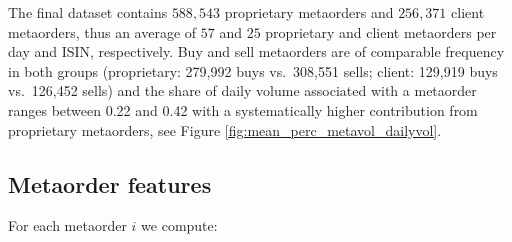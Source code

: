 \documentclass[11pt]{article}
\begin{document}
The final dataset contains $588,543$
proprietary metaorders and $256,371$ client metaorders, thus an average of $57$ and $25$ proprietary and client metaorders per day and ISIN, respectively. Buy and sell metaorders are of comparable frequency 
in both groups (proprietary: 279,992 buys vs.\ 308,551 sells; client: 129,919 buys vs.\ 126,452 sells) and the share of daily volume associated with a metaorder ranges between 0.22 and 0.42 with a systematically higher contribution from proprietary metaorders, see Figure \ref{fig:mean_perc_metavol_dailyvol}.

\subsection{Metaorder features}

For each metaorder $i$ we compute:
\end{document}
